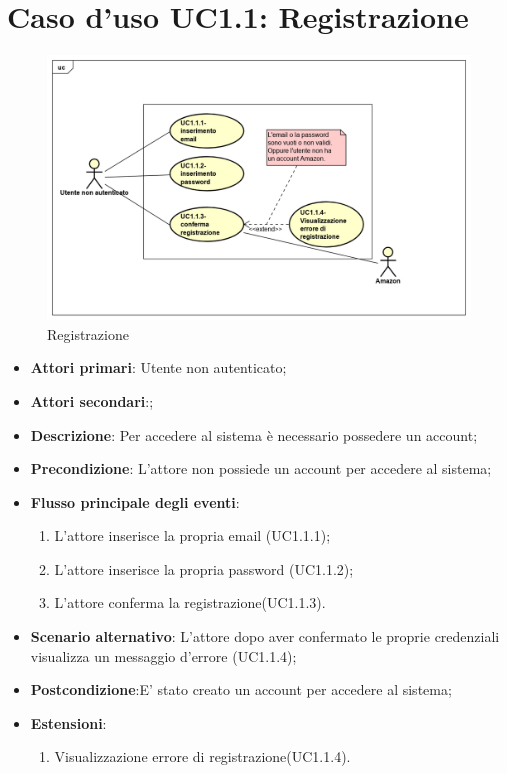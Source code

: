 \section{Caso d'uso UC1.1: Registrazione}
\begin{figure} [h]
	\centering
	\includegraphics[scale=0.4]{./Diagram/UC1-1.png}
	\caption{Registrazione}\label{}
\end{figure}
\begin{itemize}
	\item \textbf{Attori primari}: Utente non autenticato;
	\item \textbf{Attori secondari}:;
	\item \textbf{Descrizione}: Per accedere al sistema è necessario possedere un account;
	\item \textbf{Precondizione}: L'attore non possiede un account per accedere al sistema;
	\item \textbf{Flusso principale degli eventi}: 
	\begin{enumerate}
		\item L'attore inserisce la propria email (UC1.1.1);
		\item L'attore inserisce la propria password (UC1.1.2);
		\item L'attore conferma la registrazione(UC1.1.3).
	\end{enumerate}
	\item \textbf{Scenario alternativo}: L'attore dopo aver confermato le proprie credenziali visualizza un messaggio d'errore (UC1.1.4);
	\item \textbf{Postcondizione}:E' stato creato un account per accedere al sistema;
	\item \textbf{Estensioni}:
	\begin{enumerate}
		\item	Visualizzazione errore di registrazione(UC1.1.4).
	\end{enumerate}
\end{itemize}

